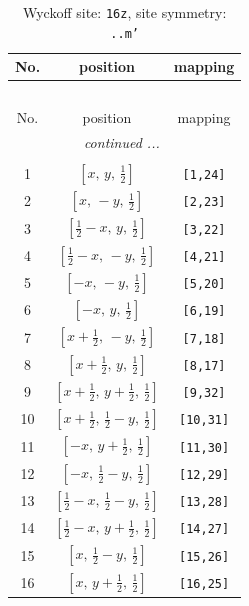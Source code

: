 \documentclass[fleqn,8pt]{jsarticle}
\begin{document}
\renewcommand{\arraystretch}{1.2}
\begin{longtable}{ccc}
\caption{Wyckoff site: {\tt 16z}, site symmetry: {\tt ..m'}}
 \\
 \hline \hline
No. & position & mapping \\ \hline \endfirsthead

\multicolumn{2}{l}{\tablename\ \thetable{}} \\
 \hline \hline
No. & position & mapping \\ \hline \endhead

 \hline \hline
\multicolumn{2}{r}{\footnotesize\it continued ...} \\ \endfoot

 \hline \hline
\multicolumn{2}{r}{} \\ \endlastfoot

1 & $\left[ x,\, y,\, \frac{1}{2} \right]$ & {\tt [1,24]} \\ \hline
2 & $\left[ x,\, - y,\, \frac{1}{2} \right]$ & {\tt [2,23]} \\ \hline
3 & $\left[ \frac{1}{2} - x,\, y,\, \frac{1}{2} \right]$ & {\tt [3,22]} \\ \hline
4 & $\left[ \frac{1}{2} - x,\, - y,\, \frac{1}{2} \right]$ & {\tt [4,21]} \\ \hline
5 & $\left[ - x,\, - y,\, \frac{1}{2} \right]$ & {\tt [5,20]} \\ \hline
6 & $\left[ - x,\, y,\, \frac{1}{2} \right]$ & {\tt [6,19]} \\ \hline
7 & $\left[ x + \frac{1}{2},\, - y,\, \frac{1}{2} \right]$ & {\tt [7,18]} \\ \hline
8 & $\left[ x + \frac{1}{2},\, y,\, \frac{1}{2} \right]$ & {\tt [8,17]} \\ \hline
9 & $\left[ x + \frac{1}{2},\, y + \frac{1}{2},\, \frac{1}{2} \right]$ & {\tt [9,32]} \\ \hline
10 & $\left[ x + \frac{1}{2},\, \frac{1}{2} - y,\, \frac{1}{2} \right]$ & {\tt [10,31]} \\ \hline
11 & $\left[ - x,\, y + \frac{1}{2},\, \frac{1}{2} \right]$ & {\tt [11,30]} \\ \hline
12 & $\left[ - x,\, \frac{1}{2} - y,\, \frac{1}{2} \right]$ & {\tt [12,29]} \\ \hline
13 & $\left[ \frac{1}{2} - x,\, \frac{1}{2} - y,\, \frac{1}{2} \right]$ & {\tt [13,28]} \\ \hline
14 & $\left[ \frac{1}{2} - x,\, y + \frac{1}{2},\, \frac{1}{2} \right]$ & {\tt [14,27]} \\ \hline
15 & $\left[ x,\, \frac{1}{2} - y,\, \frac{1}{2} \right]$ & {\tt [15,26]} \\ \hline
16 & $\left[ x,\, y + \frac{1}{2},\, \frac{1}{2} \right]$ & {\tt [16,25]} \\
\end{longtable}
\end{document}
